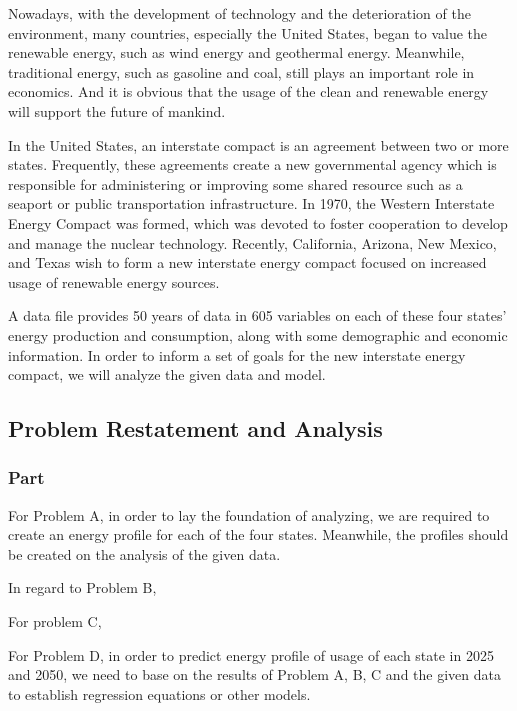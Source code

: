 \documentclass[a4paper,11pt]{article}
\begin{document}
\par Nowadays, with the development of technology and the deterioration of the environment, many countries, especially the United States, began to value the renewable energy, such as wind energy and geothermal energy. Meanwhile, traditional energy, such as gasoline and coal, still plays an important role in economics. And it is obvious that the usage of the clean and renewable energy will support the future of mankind.
\par In the United States, an interstate compact is an agreement between two or more states. Frequently, these agreements create a new governmental agency which is responsible for administering or improving some shared resource such as a seaport or public transportation infrastructure.\cite{1} In 1970, the Western Interstate Energy Compact was formed, which was devoted to foster cooperation to develop and manage the nuclear technology. Recently, California, Arizona, New Mexico, and Texas wish to form a new interstate energy compact focused on increased usage of renewable energy sources. 
\par A data file provides 50 years of data in 605 variables on each of these four states' energy production and consumption, along with some demographic and economic information. In order to inform a set of goals for the new interstate energy compact, we will analyze the given data and model.





\subsection{Problem Restatement and Analysis}
\subsubsection{Part \uppercase\expandafter{}}
\par For Problem A, in order to lay the foundation of analyzing, we are required to create an energy profile for each of the four states. Meanwhile, the profiles should be created on the analysis of the given data.

\par In regard to Problem B, 

\par For problem C, 

\par For Problem D, in order to predict energy profile of usage of each state in 2025 and 2050, we need to base on the results of Problem A, B, C and the given data to establish regression equations or other models.
\end{document}
